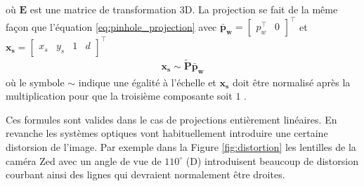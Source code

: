 où $\boldsymbol{E}$ est une matrice de transformation 3D. La projection se fait de la même façon que l'équation \ref{eq:pinhole_projection} avec $\boldsymbol{\bar{p}_w} = \begin{bmatrix}p_w^\top & 0 \end{bmatrix}^\top$ et $\boldsymbol{x_s} = \begin{bmatrix}x_s & y_s & 1 & d\end{bmatrix}^\top$
\begin{align}
  \boldsymbol{x_s} \sim \boldsymbol{\tilde{P}} \boldsymbol{\bar{p}_w}
\end{align}
où le symbole $\sim$ indique une égalité à l'échelle et $\boldsymbol{x_s}$ doit être normalisé après la multiplication pour que la troisième composante soit $1$ \citep{Szeliski2011}.

Ces formules sont valides dans le cas de projections entièrement linéaires. En revanche les systèmes optiques vont habituellement introduire une certaine distorsion de l'image. Par exemple dans la Figure \ref{fig:distortion} les lentilles de la caméra Zed avec un angle de vue de $110^\circ$ (D) introduisent beaucoup de distorsion courbant ainsi des lignes qui devraient normalement être droites.

